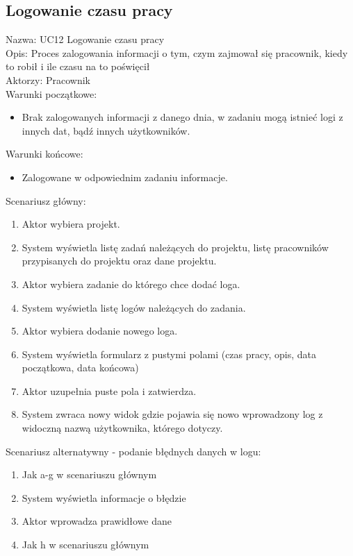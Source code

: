 \subsection{Logowanie czasu pracy}
Nazwa: UC12 Logowanie czasu pracy\\
Opis: Proces zalogowania informacji o tym, czym zajmował się pracownik, kiedy to robił i ile czasu na to poświęcił \\
Aktorzy: Pracownik \\
Warunki początkowe:
\begin{itemize}
\item Brak zalogowanych informacji z danego dnia, w zadaniu mogą istnieć logi z innych dat, bądź innych użytkowników.
\end{itemize}
Warunki końcowe:
\begin{itemize}
\item Zalogowane w odpowiednim zadaniu informacje.
\end{itemize}
Scenariusz główny:
\begin{enumerate}
\item Aktor wybiera projekt.
\item System wyświetla listę zadań należących do projektu, listę pracowników przypisanych do projektu oraz dane projektu.
\item Aktor wybiera zadanie do którego chce dodać loga.
\item System wyświetla listę logów należących do zadania.
\item Aktor wybiera dodanie nowego loga.
\item System wyświetla formularz z pustymi polami (czas pracy, opis, data początkowa, data końcowa)
\item Aktor uzupełnia puste pola i zatwierdza.
\item System zwraca nowy widok gdzie pojawia się nowo wprowadzony log z widoczną nazwą użytkownika, którego dotyczy.
\end{enumerate}
Scenariusz alternatywny - podanie błędnych danych w logu: 
\begin{enumerate}
\item Jak a-g w scenariuszu głównym
\item System wyświetla informacje o błędzie
\item Aktor wprowadza prawidłowe dane
\item Jak h w scenariuszu głównym
\end{enumerate}

